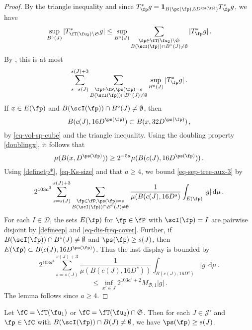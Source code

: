     \begin{proof}
        \leanok
        By the triangle inequality and since $T_{\fp}^* g = \mathbf{1}_{B(\pc(\fp), 5D^{\ps(\fp)})} T_{\fp}^* g$, we have
        $$
            \sup_{B^\circ{}(J)} |T_{\fT(\fu_2) \setminus\mathfrak{S}}^* g|
            \leq \sup_{B^\circ{}(J)} \sum_{\substack{\fp \in \fT(\fu_2) \setminus \mathfrak{S}\\ B(\scI(\fp)) \cap B^\circ(J) \ne \emptyset}} |T_{\fp}^*g|\,.
        $$
        By , this is at most
      \begin{equation}
            \label{eq-sep-tree-aux-3}
            \sum_{s = s(J)}^{s(J) + 3} \sum_{\substack{\fp \in \fP, \ps(\fp) = s\\ B(\scI(\fp)) \cap B^\circ(J) \ne \emptyset}} \sup_{B^\circ{}(J)} |T_{\fp}^* g|\,.
        \end{equation}
        If $x \in E(\fp)$ and $B(\scI(\fp)) \cap B^\circ(J) \ne \emptyset$, then
        $$
            B(c(J), 16D^{\ps(\fp)}) \subset B(x, 32 D^{\ps(\fp)})\,,
        $$
        by \eqref{eq-vol-sp-cube} and the triangle inequality. Using the doubling property \eqref{doublingx}, it follows that
        $$
            \mu(B(x, D^{\ps(\fp)})) \ge 2^{-5a} \mu(B(c(J), 16D^{\ps(\fp)}))\,.
        $$
        Using \eqref{definetp*}, \eqref{eq-Ks-size} and that $a \ge 4$, we bound \eqref{eq-sep-tree-aux-3} by
        $$
            2^{103a^3}\sum_{s = s(J)}^{s(J) + 3} \sum_{\substack{\fp \in \fP, \ps(\fp) = s\\B(\scI(\fp)) \cap B^\circ(J) \ne \emptyset}} \frac{1}{\mu(B(c(J), 16 D^s)} \int_{E(\fp)} |g| \, \mathrm{d}\mu\,.
        $$
        For each $I \in \mathcal{D}$, the sets $E(\fp)$ for $\fp \in \fP$ with $\scI(\fp) = I$ are pairwise disjoint by \eqref{defineep} and \eqref{eq-dis-freq-cover}.
        Further, if $B(\scI(\fp)) \cap B^\circ(J) \ne \emptyset$ and $\ps(\fp) \ge s(J)$, then $E(\fp) \subset B(c(J), 16 D^{\ps(\fp)})$. Thus the last display is bounded by
        $$
            2^{103a^3}\sum_{s = s(J)}^{s(J) + 3} \frac{1}{\mu(B(c(J), 16 D^s))} \int_{B(c(J), 16 D^s)} |g| \, \mathrm{d}\mu\,.
        $$
        $$
            \le \inf_{x' \in J} 2^{103a^3 +2} M_{\mathcal{B}, 1} |g|\,.
        $$
        The lemma follows since $a \ge 4$.
    \end{proof}

    \begin{lemma}
        \label{scales-impacting-interval}
        \leanok
        Let $\fC = \fT(\fu_1)$ or $\fC = \fT(\fu_2) \cap \mathfrak{S}$. Then for each $J \in \mathcal{J}'$ and $\fp \in \fC$ with $B(\scI(\fp)) \cap B(J) \neq \emptyset$, we have $\ps(\fp) \ge s(J)$.
    \end{lemma}

